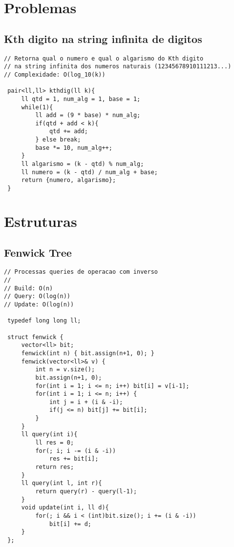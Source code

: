 \documentclass[11pt, a4paper, twoside]{article}
\begin{document}
\clearpage


%
%

\section{Problemas}

\subsection{Kth digito na string infinita de digitos}
\begin{lstlisting}
// Retorna qual o numero e qual o algarismo do Kth digito 
// na string infinita dos numeros naturais (12345678910111213...)
// Complexidade: O(log_10(k))

 pair<ll,ll> kthdig(ll k){
     ll qtd = 1, num_alg = 1, base = 1;
     while(1){
         ll add = (9 * base) * num_alg;
         if(qtd + add < k){
             qtd += add;
         } else break;
         base *= 10, num_alg++;
     }
     ll algarismo = (k - qtd) % num_alg;
     ll numero = (k - qtd) / num_alg + base;
     return {numero, algarismo};
 }
\end{lstlisting}

\clearpage


%
%

\section{Estruturas}

\subsection{Fenwick Tree}
\begin{lstlisting}
// Processas queries de operacao com inverso
//
// Build: O(n)
// Query: O(log(n))
// Update: O(log(n))

 typedef long long ll;
 
 struct fenwick {
     vector<ll> bit;
     fenwick(int n) { bit.assign(n+1, 0); }
     fenwick(vector<ll>& v) {
         int n = v.size();
         bit.assign(n+1, 0);
         for(int i = 1; i <= n; i++) bit[i] = v[i-1];
         for(int i = 1; i <= n; i++) {
             int j = i + (i & -i);
             if(j <= n) bit[j] += bit[i];
         }
     }
     ll query(int i){
         ll res = 0;
         for(; i; i -= (i & -i))
             res += bit[i];
         return res;
     }
     ll query(int l, int r){
         return query(r) - query(l-1);
     }
     void update(int i, ll d){
         for(; i && i < (int)bit.size(); i += (i & -i))
             bit[i] += d;
     }
 };
\end{lstlisting}
\end{document}
